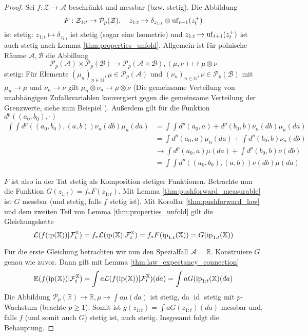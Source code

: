 \begin{proof}
Sei $f:\mathcal{Z}\rightarrow \mathcal{A}$ beschränkt und messbar (bzw. stetig). Die Abbildung 
$$F:\mathcal{Z}_{1:t}\rightarrow\mathcal{P}_p(\mathcal{Z}), \quad z_{1:t}\mapsto \delta_{z_{1:t}} \otimes \operatorname{uf}_{t+1}(z_t^+)$$ 
ist stetig: $z_{1:t} \mapsto \delta_{z_{1:t}}$ ist stetig (sogar eine Isometrie) und $z_{1:t} \mapsto \operatorname{uf}_{t+1}(z_t^+)$ ist auch stetig nach Lemma \ref{thm:properties_unfold}. Allgemein ist für polnische Räume $\mathcal{A},\mathcal{B}$ die Abbillung 
$$\mathcal{P}_p(\mathcal{A})\times \mathcal{P}_p(\mathcal{B}) \rightarrow \mathcal{P}_p(\mathcal{A}\times \mathcal{B}), (\mu,\nu) \mapsto \mu \otimes \nu$$
stetig: Für Elemente $(\mu_n)_{n\in\mathbb{N}}, \mu \in \mathcal{P}_p(\mathcal{A})$ und $(\nu_n)_{n\in\mathbb{N}}, \nu \in \mathcal{P}_p(\mathcal{B})$ mit $\mu_n \rightarrow \mu$ und $\nu_n \rightarrow \nu$ gilt $\mu_n \otimes \nu_n \rightarrow \mu \otimes \nu$ (Die gemeinsame Verteilung von unabhängigen Zufallsvariablen konvergiert gegen die gemeinsame Verteilung der Grenzwerte, siehe zum Beispiel \cite[Satz 5.30]{kallenberg}). Außerdem gilt für die Funktion $d^p((a_0, b_0), \cdot)$ 
\begin{align*}
    \int \int d^p\left((a_0, b_0), (a,b)\right) \nu_n(db)\mu_n(da) &= \int \int d^p(a_0, a) + d^p(b_0, b) \nu_n(db) \mu_n(da) \\
    &= \int d^p(a_0, a) \mu_n(da) + \int d^p(b_0, b) \nu_n(db) \\
    &\rightarrow \int d^p(a_0, a) \mu(da) + \int d^p(b_0,b) \nu(db) \\
    &= \int \int d^p\left((a_0, b_0), (a,b)\right) \nu(db) \mu(da)
\end{align*}

$F$ ist also in der Tat stetig als Komposition stetiger Funktionen. Betrachte nun die Funktion $G(z_{1:t}) = f_*F(z_{1:t})$. Mit Lemma \ref{thm:pushforward_measurable} ist $G$ messbar (und stetig, falls $f$ stetig ist). Mit Korollar \ref{thm:pushforward_law} und dem zweiten Teil von Lemma \ref{thm:properties_unfold} gilt die Gleichungskette
$$\mathcal{L}(f(\operatorname{ip}(\mathbb{X}))\vert \mathcal{F}_t^\mathbb{X}) = f_*\mathcal{L}(\operatorname{ip}(\mathbb{X}) \vert \mathcal{F}_t^\mathbb{X}) = f_*F(\operatorname{ip}_{1:t}(\mathbb{X}))=G(\operatorname{ip}_{1:t}(\mathbb{X}))$$

Für die erste Gleichung betrachten wir nun den Spezialfall $\mathcal{A}=\mathbb{R}$. Konstruiere $G$ genau wie zuvor. Dann gilt mit Lemma \ref{thm:law_expectancy_connection}
$$\mathbb{E}(f(\operatorname{ip}(\mathbb{X}))\vert \mathcal{F}_t^\mathbb{X}) = \int a \mathcal{L}(f(\operatorname{ip}(\mathbb{X}))\vert \mathcal{F}_t^\mathbb{X})(da) = \int a G(\operatorname{ip}_{1:t}(\mathbb{X})(da)$$
Die Abbildung $\mathcal{P}_p(\mathbb{R}) \rightarrow \mathbb{R}, \mu \mapsto \int a \mu(da)$ ist stetig, da $\operatorname{id}$ stetig mit $p$-Wachstum (beachte $p\geq 1$). Somit ist $g(z_{1:t}) = \int a G(z_{1:t})(da)$ messbar und, falls $f$ (und somit auch $G$) stetig ist, auch stetig. Insgesamt folgt die Behauptung.
\end{proof}

